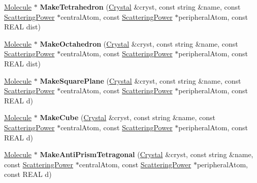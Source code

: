 \begin{DoxyCompactItemize}
\item 
\mbox{\label{namespace_obj_cryst_aa5fa14f75481b6543506d73829f81f20}} 
\mbox{\hyperlink{class_obj_cryst_1_1_molecule}{Molecule}} $\ast$ {\bfseries Make\+Tetrahedron} (\mbox{\hyperlink{class_obj_cryst_1_1_crystal}{Crystal}} \&cryst, const string \&name, const \mbox{\hyperlink{class_obj_cryst_1_1_scattering_power}{Scattering\+Power}} $\ast$central\+Atom, const \mbox{\hyperlink{class_obj_cryst_1_1_scattering_power}{Scattering\+Power}} $\ast$peripheral\+Atom, const R\+E\+AL dist)
\item 
\mbox{\label{namespace_obj_cryst_a96d4bf027433f59b4346f09cc26db523}} 
\mbox{\hyperlink{class_obj_cryst_1_1_molecule}{Molecule}} $\ast$ {\bfseries Make\+Octahedron} (\mbox{\hyperlink{class_obj_cryst_1_1_crystal}{Crystal}} \&cryst, const string \&name, const \mbox{\hyperlink{class_obj_cryst_1_1_scattering_power}{Scattering\+Power}} $\ast$central\+Atom, const \mbox{\hyperlink{class_obj_cryst_1_1_scattering_power}{Scattering\+Power}} $\ast$peripheral\+Atom, const R\+E\+AL dist)
\item 
\mbox{\label{namespace_obj_cryst_a06c804435f17856203093cd9e2fe9d97}} 
\mbox{\hyperlink{class_obj_cryst_1_1_molecule}{Molecule}} $\ast$ {\bfseries Make\+Square\+Plane} (\mbox{\hyperlink{class_obj_cryst_1_1_crystal}{Crystal}} \&cryst, const string \&name, const \mbox{\hyperlink{class_obj_cryst_1_1_scattering_power}{Scattering\+Power}} $\ast$central\+Atom, const \mbox{\hyperlink{class_obj_cryst_1_1_scattering_power}{Scattering\+Power}} $\ast$peripheral\+Atom, const R\+E\+AL d)
\item 
\mbox{\label{namespace_obj_cryst_a2ecc32a9c103687a848874ff65f1322c}} 
\mbox{\hyperlink{class_obj_cryst_1_1_molecule}{Molecule}} $\ast$ {\bfseries Make\+Cube} (\mbox{\hyperlink{class_obj_cryst_1_1_crystal}{Crystal}} \&cryst, const string \&name, const \mbox{\hyperlink{class_obj_cryst_1_1_scattering_power}{Scattering\+Power}} $\ast$central\+Atom, const \mbox{\hyperlink{class_obj_cryst_1_1_scattering_power}{Scattering\+Power}} $\ast$peripheral\+Atom, const R\+E\+AL d)
\item 
\mbox{\label{namespace_obj_cryst_a2d9af677be294cce515b8e8f3d33a2f8}} 
\mbox{\hyperlink{class_obj_cryst_1_1_molecule}{Molecule}} $\ast$ {\bfseries Make\+Anti\+Prism\+Tetragonal} (\mbox{\hyperlink{class_obj_cryst_1_1_crystal}{Crystal}} \&cryst, const string \&name, const \mbox{\hyperlink{class_obj_cryst_1_1_scattering_power}{Scattering\+Power}} $\ast$central\+Atom, const \mbox{\hyperlink{class_obj_cryst_1_1_scattering_power}{Scattering\+Power}} $\ast$peripheral\+Atom, const R\+E\+AL d)

\end{DoxyCompactItemize}
